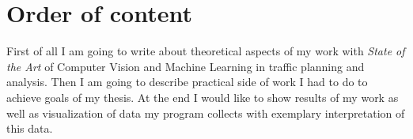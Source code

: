 \section{Order of content}
\label{sec:orderOfContent}
First of all I am going to write about theoretical aspects of my work with \textit{State of the Art} of Computer Vision and Machine Learning in traffic planning and analysis. Then I am going to describe practical side of work I had to do to achieve goals of my thesis. At the end I would like to show results of my work as well as visualization of data my program collects with exemplary interpretation of this data. 














